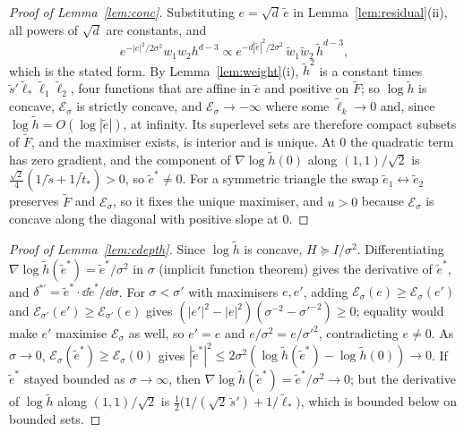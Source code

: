 \begin{proof}[Proof of Lemma~\ref{lem:conc}]
Substituting $e = \sqrt d\,\tilde e$ in Lemma~\ref{lem:residual}(ii), all powers of $\sqrt d$ are constants, and
\[ e^{-|e|^2/2\sigma^2}w_1w_2h^{d-3} \propto e^{-d|\tilde e|^2/2\sigma^2}\,\tilde w_1\tilde w_2\,\tilde h^{d-3}, \]
which is the stated form. By Lemma~\ref{lem:weight}(i), $\tilde h^2$ is a constant times $\tilde s'\tilde\ell_*\tilde\ell_1\tilde\ell_2$, four
functions that are affine in $\tilde e$ and positive on $\tilde F$; so $\log\tilde h$ is concave, $\mathcal E_\sigma$ is strictly
concave, and $\mathcal E_\sigma \to -\infty$ where some $\tilde\ell_k \to 0$ and, since $\log\tilde h = O(\log|\tilde e|)$, at
infinity. Its superlevel sets are therefore compact subsets of $\tilde F$, and the maximiser exists, is interior and is
unique. At $0$ the quadratic term has zero gradient, and the component of $\nabla\log\tilde h(0)$ along
$(1,1)/\sqrt2$ is $\tfrac{\sqrt2}{4}(1/\tilde s + 1/\tilde t_*) > 0$, so $\tilde e^* \ne 0$. For a symmetric triangle the swap
$\tilde e_1 \leftrightarrow \tilde e_2$ preserves $\tilde F$ and $\mathcal E_\sigma$, so it fixes the unique maximiser, and $u > 0$
because $\mathcal E_\sigma$ is concave along the diagonal with positive slope at $0$.
\end{proof}

\begin{proof}[Proof of Lemma~\ref{lem:cdepth}]
Since $\log\tilde h$ is concave, $H \succeq I/\sigma^2$. Differentiating $\nabla\log\tilde h(\tilde e^*) = \tilde e^*/\sigma^2$ in
$\sigma$ (implicit function theorem) gives the derivative of $\tilde e^*$, and $\delta^{*\prime} = \tilde e^*\cdot\dd\tilde e^*/\dd\sigma$.
For $\sigma < \sigma'$ with maximisers $e, e'$, adding $\mathcal E_\sigma(e) \ge \mathcal E_\sigma(e')$ and
$\mathcal E_{\sigma'}(e') \ge \mathcal E_{\sigma'}(e)$ gives $(|e'|^2 - |e|^2)(\sigma^{-2} - \sigma'^{-2}) \ge 0$; equality would make
$e'$ maximise $\mathcal E_\sigma$ as well, so $e' = e$ and $e/\sigma^2 = e/\sigma'^2$, contradicting $e \ne 0$. As $\sigma \to 0$,
$\mathcal E_\sigma(\tilde e^*) \ge \mathcal E_\sigma(0)$ gives $|\tilde e^*|^2 \le 2\sigma^2(\log\tilde h(\tilde e^*) - \log\tilde h(0)) \to 0$.
If $\tilde e^*$ stayed bounded as $\sigma \to \infty$, then $\nabla\log\tilde h(\tilde e^*) = \tilde e^*/\sigma^2 \to 0$; but the
derivative of $\log\tilde h$ along $(1,1)/\sqrt2$ is $\tfrac12\bigl(1/(\sqrt2\,\tilde s') + 1/\tilde\ell_*\bigr)$, which is bounded
below on bounded sets.
\end{proof}

